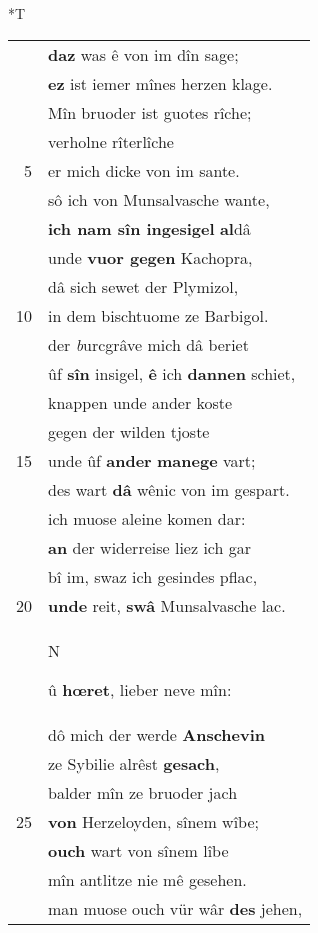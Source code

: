 \documentclass[8pt,a4paper,notitlepage]{article}
\begin{document}
\begin{table}[ht]
\begin{minipage}[t]{0.5\linewidth}
\small
\begin{center}*T
\end{center}
\begin{tabular}{rl}
 & \textbf{daz} was ê von im dîn sage;\\ 
 & \textbf{ez} ist iemer mînes herzen klage.\\ 
 & Mîn bruoder ist guotes rîche;\\ 
 & verholne rîterlîche\\ 
5 & er mich dicke von im sante.\\ 
 & sô ich von Munsalvasche wante,\\ 
 & \textbf{ich nam sîn ingesigel} \textbf{al}dâ\\ 
 & unde \textbf{vuor gegen} Kachopra,\\ 
 & dâ sich sewet der Plymizol,\\ 
10 & in dem bischtuome ze Barbigol.\\ 
 & der \textit{b}urcgrâve mich dâ beriet\\ 
 & ûf \textbf{sîn} insigel, \textbf{ê} ich \textbf{dannen} schiet,\\ 
 & knappen unde ander koste\\ 
 & gegen der wilden tjoste\\ 
15 & unde ûf \textbf{ander} \textbf{manege} vart;\\ 
 & des wart \textbf{dâ} wênic von im gespart.\\ 
 & ich muose aleine komen dar:\\ 
 & \textbf{an} der widerreise liez ich gar\\ 
 & bî im, swaz ich gesindes pflac,\\ 
20 & \textbf{unde} reit, \textbf{swâ} Munsalvasche lac.\\ 
 & \begin{large}N\end{large}û \textbf{hœret}, lieber neve mîn:\\ 
 & dô mich der werde \textbf{Anschevin}\\ 
 & ze Sybilie alrêst \textbf{gesach},\\ 
 & balder mîn ze bruoder jach\\ 
25 & \textbf{von} Herzeloyden, sînem wîbe;\\ 
 & \textbf{ouch} wart von sînem lîbe\\ 
 & mîn antlitze nie mê gesehen.\\ 
 & man muose ouch vür wâr \textbf{des} jehen,\\ 

\end{tabular}
\end{minipage}
\end{table}
\end{document}
